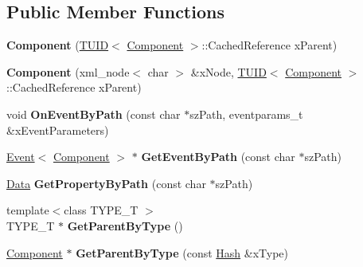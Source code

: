 \subsection*{Public Member Functions}
\begin{DoxyCompactItemize}
\item 
\hypertarget{class_k_g_e_1_1_component_af85894a43348979804943c44095a6bc7}{{\bfseries Component} (\hyperlink{class_k_g_e_1_1_t_u_i_d}{T\-U\-I\-D}$<$ \hyperlink{class_k_g_e_1_1_component}{Component} $>$\-::Cached\-Reference x\-Parent)}\label{class_k_g_e_1_1_component_af85894a43348979804943c44095a6bc7}

\item 
\hypertarget{class_k_g_e_1_1_component_a33359d0c293e91dc1cd6445d11c09878}{{\bfseries Component} (xml\-\_\-node$<$ char $>$ \&x\-Node, \hyperlink{class_k_g_e_1_1_t_u_i_d}{T\-U\-I\-D}$<$ \hyperlink{class_k_g_e_1_1_component}{Component} $>$\-::Cached\-Reference x\-Parent)}\label{class_k_g_e_1_1_component_a33359d0c293e91dc1cd6445d11c09878}

\item 
\hypertarget{class_k_g_e_1_1_component_a3126cb2bd30ca80dbd4ce228aafc4072}{void {\bfseries On\-Event\-By\-Path} (const char $\ast$sz\-Path, eventparams\-\_\-t \&x\-Event\-Parameters)}\label{class_k_g_e_1_1_component_a3126cb2bd30ca80dbd4ce228aafc4072}

\item 
\hypertarget{class_k_g_e_1_1_component_a5667460ebc2a72c2b75d26e754926948}{\hyperlink{class_k_g_e_1_1_event}{Event}$<$ \hyperlink{class_k_g_e_1_1_component}{Component} $>$ $\ast$ {\bfseries Get\-Event\-By\-Path} (const char $\ast$sz\-Path)}\label{class_k_g_e_1_1_component_a5667460ebc2a72c2b75d26e754926948}

\item 
\hypertarget{class_k_g_e_1_1_component_af8a56a0f8035731eb8c54af5f1a1d50b}{\hyperlink{class_k_g_e_1_1_data}{Data} {\bfseries Get\-Property\-By\-Path} (const char $\ast$sz\-Path)}\label{class_k_g_e_1_1_component_af8a56a0f8035731eb8c54af5f1a1d50b}

\item 
\hypertarget{class_k_g_e_1_1_component_a8263ad0b576478b77eb0aa06eb3e0c82}{{\footnotesize template$<$class T\-Y\-P\-E\-\_\-\-T $>$ }\\T\-Y\-P\-E\-\_\-\-T $\ast$ {\bfseries Get\-Parent\-By\-Type} ()}\label{class_k_g_e_1_1_component_a8263ad0b576478b77eb0aa06eb3e0c82}

\item 
\hypertarget{class_k_g_e_1_1_component_ad20a2b1caaacf735fdd4dfc1332fbb08}{\hyperlink{class_k_g_e_1_1_component}{Component} $\ast$ {\bfseries Get\-Parent\-By\-Type} (const \hyperlink{class_k_g_e_1_1_hash}{Hash} \&x\-Type)}\label{class_k_g_e_1_1_component_ad20a2b1caaacf735fdd4dfc1332fbb08}


\end{DoxyCompactItemize}
